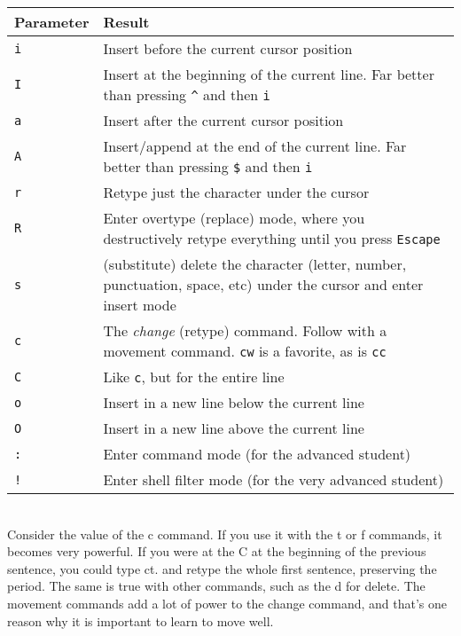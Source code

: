 \documentclass[a4paper, 12pt]{article}
\begin{document}
\begin{tabular}{ l | p{9cm}}
  {\bf Parameter} & {\bf Result} \\ \hline
  \texttt{i} & Insert before the current cursor position\\
  \texttt{I} & Insert at the beginning of the current line. Far better than pressing \texttt{\^{}} and then \texttt{i}\\
  \texttt{a} & Insert after the current cursor position\\
  \texttt{A} & Insert/append at the end of the current line. Far better than pressing \texttt{\$} and then \texttt{i}\\
  \texttt{r} & Retype just the character under the cursor\\
  \texttt{R} & Enter overtype (replace) mode, where you destructively retype everything until you press \texttt{Escape}\\
  \texttt{s} & (substitute) delete the character (letter, number, punctuation, space, etc) under the cursor and enter insert mode\\
  \texttt{c} & The \textit{change} (retype) command. Follow with a movement command. \texttt{cw} is a favorite, as is \texttt{cc}\\
  \texttt{C} & Like \texttt{c}, but for the entire line\\
  \texttt{o} & Insert in a new line below the current line\\
  \texttt{O} & Insert in a new line above the current line\\
  \texttt{:} & Enter command mode (for the advanced student)\\
  \texttt{!} & Enter shell filter mode (for the very advanced student)\\ \hline
\end{tabular}\\

Consider the value of the c command. If you use it with the t or f commands, it becomes very powerful. If you were at the C at the beginning of the previous sentence, you could type ct. and retype the whole first sentence, preserving the period. The same is true with other commands, such as the d for delete. The movement commands add a lot of power to the change command, and that's one reason why it is important to learn to move well.
\end{document}
